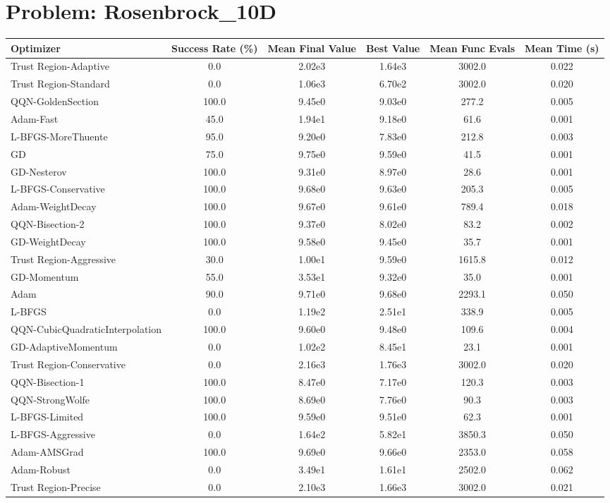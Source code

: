 \documentclass{article}
\begin{document}
\section{Problem: Rosenbrock\_10D}
\begin{longtable}{p{3cm}*{5}{c}}
\toprule
\textbf{Optimizer} & \textbf{Success Rate (\%)} & \textbf{Mean Final Value} & \textbf{Best Value} & \textbf{Mean Func Evals} & \textbf{Mean Time (s)} \\
\midrule
Trust Region-Adaptive & 0.0 & 2.02e3 & 1.64e3 & 3002.0 & 0.022 \\
Trust Region-Standard & 0.0 & 1.06e3 & 6.70e2 & 3002.0 & 0.020 \\
QQN-GoldenSection & 100.0 & 9.45e0 & 9.03e0 & 277.2 & 0.005 \\
Adam-Fast & 45.0 & 1.94e1 & 9.18e0 & 61.6 & 0.001 \\
L-BFGS-MoreThuente & 95.0 & 9.20e0 & 7.83e0 & 212.8 & 0.003 \\
GD & 75.0 & 9.75e0 & 9.59e0 & 41.5 & 0.001 \\
GD-Nesterov & 100.0 & 9.31e0 & 8.97e0 & 28.6 & 0.001 \\
L-BFGS-Conservative & 100.0 & 9.68e0 & 9.63e0 & 205.3 & 0.005 \\
Adam-WeightDecay & 100.0 & 9.67e0 & 9.61e0 & 789.4 & 0.018 \\
QQN-Bisection-2 & 100.0 & 9.37e0 & 8.02e0 & 83.2 & 0.002 \\
GD-WeightDecay & 100.0 & 9.58e0 & 9.45e0 & 35.7 & 0.001 \\
Trust Region-Aggressive & 30.0 & 1.00e1 & 9.59e0 & 1615.8 & 0.012 \\
GD-Momentum & 55.0 & 3.53e1 & 9.32e0 & 35.0 & 0.001 \\
Adam & 90.0 & 9.71e0 & 9.68e0 & 2293.1 & 0.050 \\
L-BFGS & 0.0 & 1.19e2 & 2.51e1 & 338.9 & 0.005 \\
QQN-CubicQuadraticInterpolation & 100.0 & 9.60e0 & 9.48e0 & 109.6 & 0.004 \\
GD-AdaptiveMomentum & 0.0 & 1.02e2 & 8.45e1 & 23.1 & 0.001 \\
Trust Region-Conservative & 0.0 & 2.16e3 & 1.76e3 & 3002.0 & 0.020 \\
QQN-Bisection-1 & 100.0 & 8.47e0 & 7.17e0 & 120.3 & 0.003 \\
QQN-StrongWolfe & 100.0 & 8.69e0 & 7.76e0 & 90.3 & 0.003 \\
L-BFGS-Limited & 100.0 & 9.59e0 & 9.51e0 & 62.3 & 0.001 \\
L-BFGS-Aggressive & 0.0 & 1.64e2 & 5.82e1 & 3850.3 & 0.050 \\
Adam-AMSGrad & 100.0 & 9.69e0 & 9.66e0 & 2353.0 & 0.058 \\
Adam-Robust & 0.0 & 3.49e1 & 1.61e1 & 2502.0 & 0.062 \\
Trust Region-Precise & 0.0 & 2.10e3 & 1.66e3 & 3002.0 & 0.021 \\
\bottomrule
\end{longtable}
\end{document}
